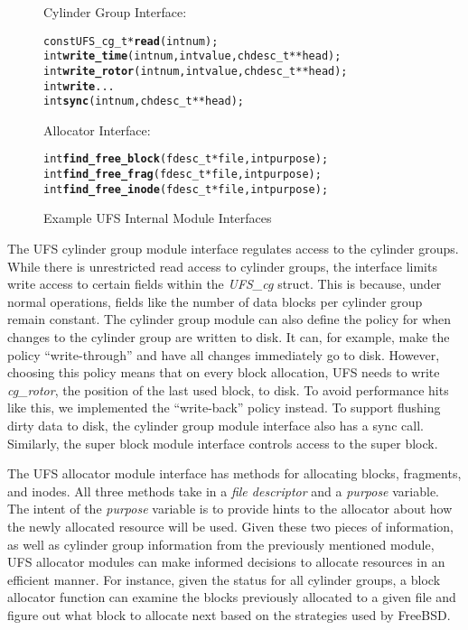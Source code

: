 \begin{figure}[htb]
Cylinder Group Interface:
\vspace{-0.5\baselineskip}
\begin{scriptsize}
\begin{alltt}
const UFS_cg_t * \textbf{read}(int num);
int \textbf{write_time}(int num, int value, chdesc_t ** head);
int \textbf{write_rotor}(int num, int value, chdesc_t ** head);
int \textbf{write}...
int \textbf{sync}(int num, chdesc_t ** head);
\end{alltt}
\end{scriptsize}

Allocator Interface:
\vspace{-0.5\baselineskip}
\begin{scriptsize}
\begin{alltt}
int \textbf{find_free_block}(fdesc_t * file, int purpose);
int \textbf{find_free_frag}(fdesc_t * file, int purpose);
int \textbf{find_free_inode}(fdesc_t * file, int purpose);
\end{alltt}
\end{scriptsize}
\vspace{-0.5\baselineskip}
\caption{\label{fig:moduleinterface} Example UFS Internal Module Interfaces}
\end{figure}

The UFS cylinder group module interface regulates access to the cylinder
groups. While there is unrestricted read access to cylinder groups, the
interface limits write access to certain fields within the \emph{UFS\_cg}
struct. This is because, under normal operations, fields like the number of
data blocks per cylinder group remain constant. The cylinder group module can
also define the policy for when changes to the cylinder group are written to
disk. It can, for example, make the policy ``write-through'' and have all
changes immediately go to disk. However, choosing this policy means that on
every block allocation, UFS needs to write \emph{cg\_rotor}, the position of
the last used block, to disk. To avoid performance hits like this, we
implemented the ``write-back'' policy instead. To support flushing dirty data
to disk, the cylinder group module interface also has a sync call. Similarly,
the super block module interface controls access to the super block.

The UFS allocator module interface has methods for allocating blocks,
fragments, and inodes. All three methods take in a \emph{file descriptor} and a
\emph{purpose} variable. The intent of the \emph{purpose} variable is to
provide hints to the allocator about how the newly allocated resource will be
used. Given these two pieces of information, as well as cylinder group
information from the previously mentioned module, UFS allocator modules can
make informed decisions to allocate resources in an efficient manner. For
instance, given the status for all cylinder groups, a block allocator function
can examine the blocks previously allocated to a given file and figure out
what block to allocate next based on the strategies used by FreeBSD.

